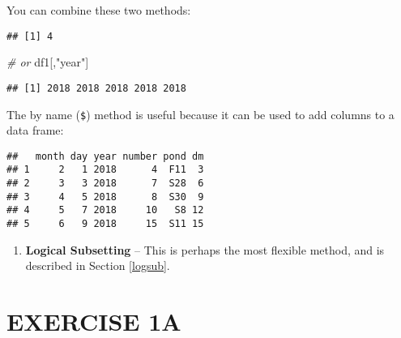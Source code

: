\documentclass[]{book}
\newenvironment{Shaded}{\begin{snugshade}}{\end{snugshade}}
\newcommand{\DecValTok}[1]{\textcolor[rgb]{0.00,0.00,0.81}{#1}}
\newcommand{\StringTok}[1]{\textcolor[rgb]{0.31,0.60,0.02}{#1}}
\newcommand{\CommentTok}[1]{\textcolor[rgb]{0.56,0.35,0.01}{\textit{#1}}}
\newcommand{\OperatorTok}[1]{\textcolor[rgb]{0.81,0.36,0.00}{\textbf{#1}}}
\newcommand{\NormalTok}[1]{#1}
\providecommand{\tightlist}{%
  \setlength{\itemsep}{0pt}\setlength{\parskip}{0pt}}
\theoremstyle{definition}
\theoremstyle{definition}
\theoremstyle{definition}
\theoremstyle{remark}
\begin{document}
You can combine these two methods:

\begin{Shaded}
\end{Shaded}

\begin{verbatim}
## [1] 4
\end{verbatim}

\begin{Shaded}
\begin{Highlighting}[]
\CommentTok{# or}
\NormalTok{df1[,}\StringTok{"year"}\NormalTok{]}
\end{Highlighting}
\end{Shaded}

\begin{verbatim}
## [1] 2018 2018 2018 2018 2018
\end{verbatim}

The by name (\texttt{\$}) method is useful because it can be used to add
columns to a data frame:

\begin{Shaded}
\end{Shaded}

\begin{verbatim}
##   month day year number pond dm
## 1     2   1 2018      4  F11  3
## 2     3   3 2018      7  S28  6
## 3     4   5 2018      8  S30  9
## 4     5   7 2018     10   S8 12
## 5     6   9 2018     15  S11 15
\end{verbatim}

\begin{enumerate}
\def\labelenumi{\arabic{enumi}.}
\setcounter{enumi}{2}
\tightlist
\item
  \textbf{Logical Subsetting} -- This is perhaps the most flexible
  method, and is described in Section \ref{logsub}.
\end{enumerate}

\section*{EXERCISE 1A}\label{exercise-1a}
\end{document}
